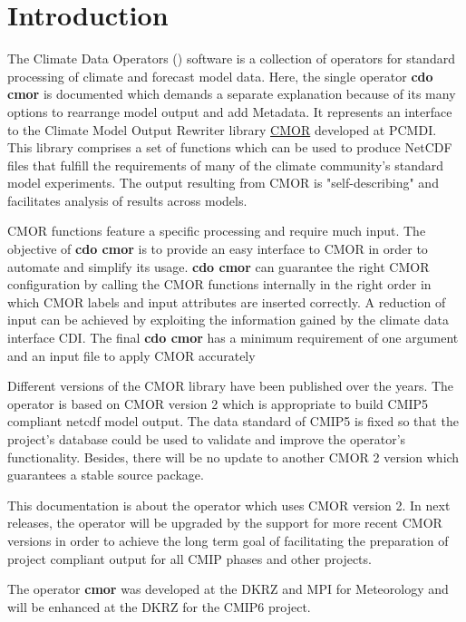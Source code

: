 \chapter{Introduction}

The Climate Data Operators ({\CDO}) software is a collection of operators
for standard processing of climate and forecast model data. Here, the single
operator \textbf{cdo cmor} is documented which demands a separate explanation 
because of its many options to rearrange model output and add Metadata.
It represents an interface to the Climate Model Output Rewriter library \href{https://pcmdi.github.io/cmor-site/}{CMOR} developed at PCMDI. This library comprises a set of functions which can be used to produce NetCDF files that fulfill the requirements of many of the climate community's standard model experiments. The output resulting from CMOR is "self-describing" and
facilitates analysis of results across models. 

CMOR functions feature a specific processing and require much input. 
The objective of \textbf{cdo cmor} is to provide an easy interface to CMOR in order
to automate and simplify its usage.
\textbf{cdo cmor} can guarantee the right CMOR configuration by calling the
CMOR functions internally in the right order in which CMOR labels and input attributes
are inserted correctly. A reduction of input can be achieved by exploiting 
the information gained by the climate data interface CDI. The final \textbf{cdo cmor} has a minimum requirement of one argument and an input file to apply CMOR accurately

Different versions of the CMOR library have been published over the years. 
The operator is based on CMOR version 2 which is appropriate to build CMIP5 compliant netcdf model output. The data standard of CMIP5 is fixed so that the project's database could be used to validate and improve the operator's functionality. Besides, there will be no update to another CMOR 2 version which guarantees a stable source package.

This documentation is about the operator which uses CMOR version 2. In next {\CDO} releases, the operator will be upgraded by the support for more recent CMOR versions in order to achieve the long term goal of facilitating the preparation of project compliant output for all CMIP phases and other projects. 

The  {\CDO} operator \textbf{cmor} was developed at the DKRZ and MPI for
Meteorology and will be enhanced at the DKRZ for the CMIP6 project. 